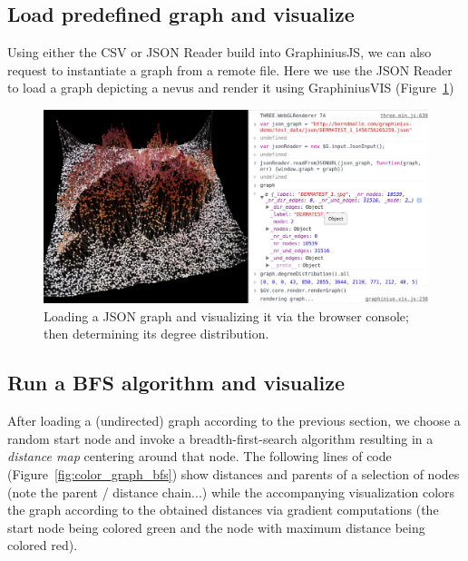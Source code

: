 	
	\subsection{Load predefined graph and visualize}
	\label{ssect:load_graph}
	
	Using either the CSV or JSON Reader build into GraphiniusJS, we can also request to instantiate a graph from a remote file. Here we use the JSON Reader to load a graph depicting a nevus and render it using GraphiniusVIS (Figure~\ref{fig:load_graph_repl})
	
	\begin{figure}[H]
		\begin{center}
			\includegraphics [width=1\textwidth] {figures/loadingGraphInREPL}
			\caption{Loading a JSON graph and visualizing it via the browser console; then determining its degree distribution.}
			\label{fig:load_graph_repl}
		\end{center}
	\end{figure}
	
	
	\subsection{Run a BFS algorithm and visualize}
	\label{ssect:run_bfs_visualize}
	
	After loading a (undirected) graph according to the previous section, we choose a random start node and invoke a breadth-first-search algorithm resulting in a \textit{distance map} centering around that node. The following lines of code (Figure~\ref{fig:color_graph_bfs}) show distances and parents of a selection of nodes (note the parent / distance chain...) while the accompanying visualization colors the graph according to the obtained distances via gradient computations (the start node being colored green and the node with maximum distance being colored red).
	
